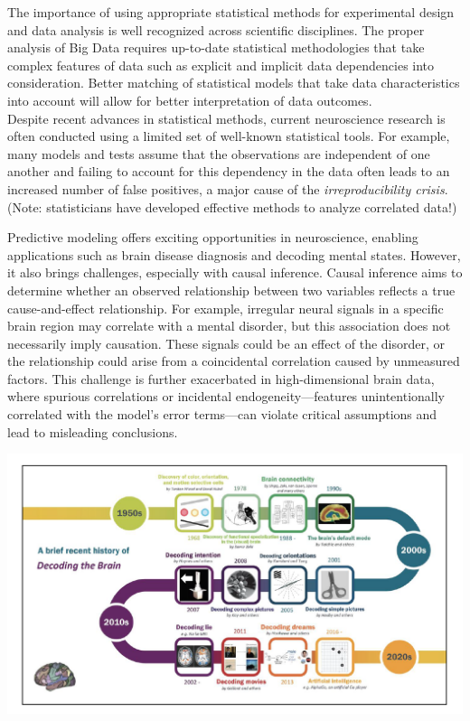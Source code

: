 \documentclass[
]{article}
\begin{document}
The importance of using appropriate statistical methods for experimental
design and data analysis is well recognized across scientific
disciplines. The proper analysis of Big Data requires up-to-date
statistical methodologies that take complex features of data such as
explicit and implicit data dependencies into consideration. Better
matching of statistical models that take data characteristics into
account will allow for better interpretation of data outcomes.\\
Despite recent advances in statistical methods, current neuroscience
research is often conducted using a limited set of well-known
statistical tools. For example, many models and tests assume that the
observations are independent of one another and failing to account for
this dependency in the data often leads to an increased number of false
positives, a major cause of the \emph{irreproducibility crisis}. (Note:
statisticians have developed effective methods to analyze correlated
data!)

Predictive modeling offers exciting opportunities in neuroscience,
enabling applications such as brain disease diagnosis and decoding
mental states. However, it also brings challenges, especially with
causal inference. Causal inference aims to determine whether an observed
relationship between two variables reflects a true cause-and-effect
relationship. For example, irregular neural signals in a specific brain
region may correlate with a mental disorder, but this association does
not necessarily imply causation. These signals could be an effect of the
disorder, or the relationship could arise from a coincidental
correlation caused by unmeasured factors. This challenge is further
exacerbated in high-dimensional brain data, where spurious correlations
or incidental endogeneity---features unintentionally correlated with the
model's error terms---can violate critical assumptions and lead to
misleading conclusions.

\includegraphics{stat_developments_history.png}
\end{document}
